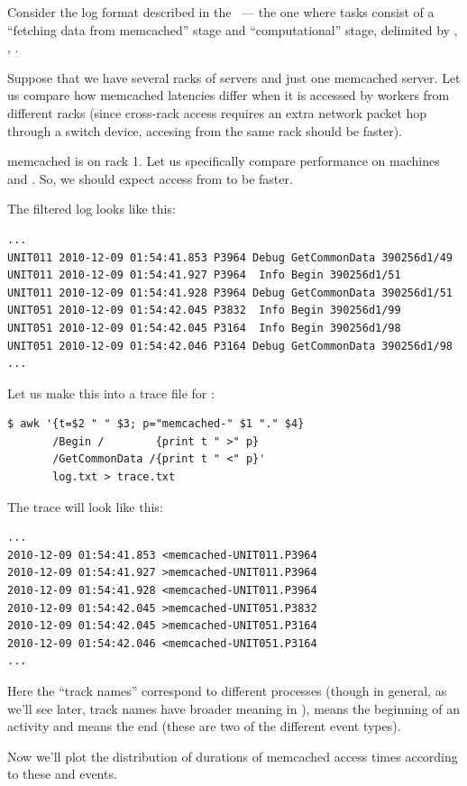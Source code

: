 \documentclass{article}
\begin{document}
Consider the log format described in the ~--- the one where tasks consist of a ``fetching data from memcached'' stage and ``computational'' stage, delimited by , , .

Suppose that we have several racks of servers and just one memcached server. Let us compare how memcached latencies differ when it is accessed by workers from different racks (since cross-rack access requires an extra network packet hop through a switch device, accesing from the same rack should be faster).

memcached is on rack 1. Let us specifically compare performance on machines  and . So, we should expect access from  to be faster.

The filtered log looks like this:
\begin{verbatim}
...
UNIT011 2010-12-09 01:54:41.853 P3964 Debug GetCommonData 390256d1/49
UNIT011 2010-12-09 01:54:41.927 P3964  Info Begin 390256d1/51
UNIT011 2010-12-09 01:54:41.928 P3964 Debug GetCommonData 390256d1/51
UNIT051 2010-12-09 01:54:42.045 P3832  Info Begin 390256d1/99
UNIT051 2010-12-09 01:54:42.045 P3164  Info Begin 390256d1/98
UNIT051 2010-12-09 01:54:42.046 P3164 Debug GetCommonData 390256d1/98
...
\end{verbatim}

Let us make this into a trace file for \timeplot{}:
\begin{verbatim}
$ awk '{t=$2 " " $3; p="memcached-" $1 "." $4}
       /Begin /        {print t " >" p} 
       /GetCommonData /{print t " <" p}'
       log.txt > trace.txt
\end{verbatim}

The trace will look like this:
\begin{verbatim}
...
2010-12-09 01:54:41.853 <memcached-UNIT011.P3964
2010-12-09 01:54:41.927 >memcached-UNIT011.P3964
2010-12-09 01:54:41.928 <memcached-UNIT011.P3964
2010-12-09 01:54:42.045 >memcached-UNIT051.P3832
2010-12-09 01:54:42.045 >memcached-UNIT051.P3164
2010-12-09 01:54:42.046 <memcached-UNIT051.P3164
...
\end{verbatim}

Here the ``track names'' correspond to different processes (though in general, as we'll see later, track names have broader meaning in \timeplot{}), \hlverb{>} means the beginning of an activity and \hlverb{<} means the end (these are two of the different event types).

Now we'll plot the distribution of durations of memcached access times according to these \hlverb{>} and \hlverb{<} events.
\end{document}
